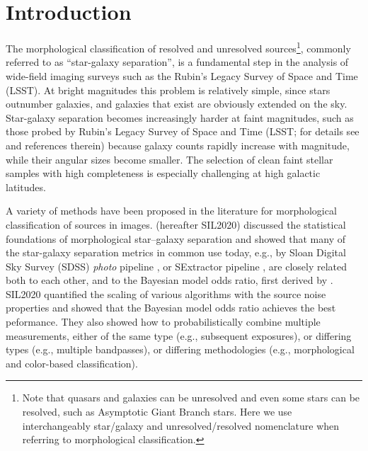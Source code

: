 \section{Introduction}

The morphological classification of resolved and unresolved sources\footnote{Note that quasars and
galaxies can be unresolved and even some stars can be resolved, such as Asymptotic Giant Branch
stars. Here we use interchangeably star/galaxy and unresolved/resolved nomenclature when referring to
morphological classification.}, commonly
referred to as ``star-galaxy separation'', is a fundamental step in the analysis of wide-field imaging surveys
such as the Rubin's Legacy Survey of Space and Time (LSST). At bright magnitudes this problem is
relatively simple, since stars outnumber galaxies, and galaxies that exist are obviously extended on the sky.
Star-galaxy separation becomes increasingly harder at faint magnitudes, such as those probed by
Rubin's Legacy Survey of Space and Time (LSST; for details see \citealt{2019ApJ...873..111I} and references therein)
because galaxy counts rapidly increase with magnitude, while their angular sizes become smaller.
The selection of clean faint stellar samples with high completeness is especially challenging at high galactic latitudes. 

A variety of methods have been proposed in the literature for morphological classification of sources in images. 
\cite{2020AJ....159...65S} (hereafter SIL2020) discussed the statistical foundations of morphological star–galaxy separation and showed
that many of the star-galaxy separation metrics in common use today, e.g., by Sloan Digital Sky Survey (SDSS) {\it photo}
pipeline \citep{2002SPIE.4836..350L}, or SExtractor pipeline \citep{1996A&AS..117..393B}, are closely
related both to each other, and to the Bayesian model odds ratio, first derived by \cite{1979AJ.....84.1526S}.
SIL2020 quantified the scaling of various algorithms with the source noise properties and showed that the Bayesian model
odds ratio achieves the best peformance. They also showed how to probabilistically combine multiple measurements,
either of the same type (e.g., subsequent exposures), or differing types (e.g., multiple bandpasses), or differing
methodologies (e.g., morphological and color-based classification).

